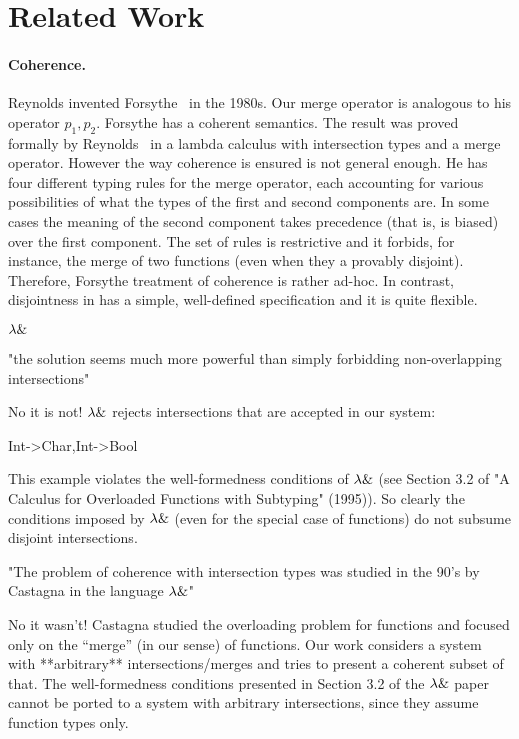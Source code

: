 \section{Related Work}
\label{sec:related-work}

\paragraph{Coherence.}
Reynolds invented Forsythe~\cite{reynolds1997design} in the 1980s. Our merge
operator is analogous to his operator $p_1, p_2 $. Forsythe has a coherent
semantics. The result was proved formally by
Reynolds~\cite{reynolds1991coherence} in a lambda calculus with intersection
types and a merge operator. However  the way coherence is ensured is not general
enough. He has four different typing rules for the merge operator, each
accounting for various possibilities of what the types of the first and second
components are. In some cases the meaning of the second component takes
precedence (that is, is biased) over the first component. The set of rules is
restrictive and it forbids, for instance, the merge of two functions (even when
they a provably disjoint). Therefore, Forsythe treatment of coherence
is rather ad-hoc. In contrast, disjointness in \name has a simple, well-defined
specification and it is quite flexible.


$\lambda \&$

"the solution seems much more powerful than simply forbidding
non-overlapping intersections"

No it is not! $\lambda \&$ rejects intersections that are accepted
in our system:

{Int->Char,Int->Bool}

This example violates the well-formedness conditions of $\lambda \&$ (see Section
3.2 of "A Calculus for Overloaded Functions with Subtyping" (1995)). So
clearly the conditions imposed by $\lambda \&$ (even for the special case of
functions) do not subsume disjoint intersections.

"The problem of coherence with intersection types was studied in the 90's
by Castagna in the language $\lambda \&$"

No it wasn't! Castagna studied the overloading problem for functions
and focused only on the “merge” (in our sense) of functions. Our work
considers a system with **arbitrary** intersections/merges and tries
to present a coherent subset of that. The well-formedness conditions
presented in Section 3.2 of the $\lambda \&$ paper cannot be ported to a
system with arbitrary intersections, since they assume function types
only.


